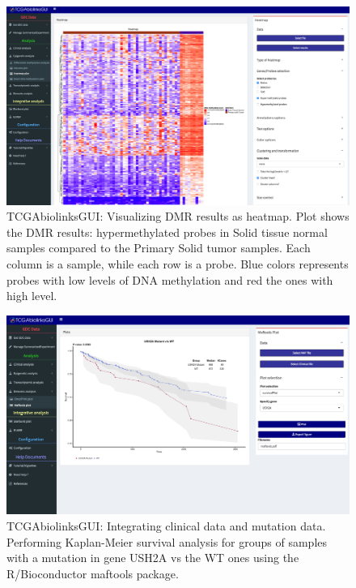\begin{figure}
\includegraphics[width=1.0\linewidth]{images/gui_heatmap.png}
\caption[TCGAbiolinksGUI: Visualizing DMR results as heatmap]{TCGAbiolinksGUI: Visualizing DMR results as heatmap. Plot shows the DMR results: hypermethylated probes in Solid tissue normal samples compared to the Primary Solid tumor samples. Each column is a sample, while each row is a probe. Blue colors represents probes with low levels of DNA methylation and red the ones with high level. }
\label{fig:gui_heatmap}
\end{figure}

  \begin{figure}[h!]
  \centering
  \includegraphics[width=1.0\textwidth]{images/clinical_mutation.png}
  \caption[TCGAbiolinksGUI: Integrating clinical data and mutation data]{TCGAbiolinksGUI: Integrating clinical data and mutation data. Performing Kaplan-Meier survival analysis for groups of samples with a mutation in gene USH2A vs the WT ones using the R/Bioconductor maftools package.}
  \label{fig:mutation_clinical}
   \end{figure}

